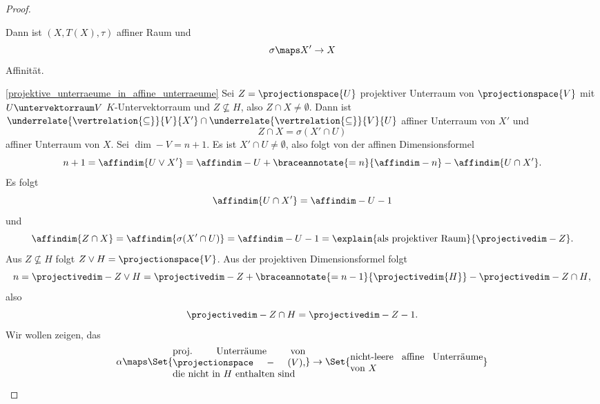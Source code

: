 \begin{proof}
\begin{proofdescription}
    Dann ist \( (X,T(X),\tau) \) affiner Raum und
    \begin{equation*}
      \sigma\maps X'\to X 
    \end{equation*}
    Affinität.
    \item[\ref{projektive_unterraeume_in_affine_unterraeume}] Sei \( Z=\projectionspace{U} \) projektiver Unterraum von \( \projectionspace{V} \) mit \( U\untervektorraum V \) \( K \)-Untervektorraum und \( Z\not\subseteq H \), also \( Z\cap X\neq \emptyset \). Dann ist \( \underrelate{\vertrelation{\subseteq}}{V}{X'}\cap  \underrelate{\vertrelation{\subseteq}}{V}{U} \) affiner Unterraum von \( X' \) und
    \begin{equation*}
      Z\cap X=\sigma(X'\cap U)
    \end{equation*}
    affiner Unterraum von \( X \).
     Sei \( \dim-{V}=n+1 \). Es ist \( X'\cap U\neq \emptyset \), also folgt von der affinen Dimensionsformel
    \begin{equation*}
      n+1=\affindim{U\vee X'}=\affindim-{U}+\braceannotate{=n}{\affindim-{n}}-\affindim{U\cap X'}.
    \end{equation*}
    Es folgt
    \begin{equation*}
      \affindim{U\cap X'}=\affindim-{U}-1
    \end{equation*}
    und
    \begin{equation*}
      \affindim{Z\cap X}=\affindim{\sigma(X'\cap U)}=\affindim-{U}-1=\explain{\text{als projektiver Raum}}{\projectivedim-{Z}}.
    \end{equation*}
    Aus  \( Z\not\subseteq H \) folgt \( Z\vee H=\projectionspace{V} \). Aus der projektiven Dimensionsformel folgt
    \begin{equation*}
      n=\projectivedim-{Z\vee H}=\projectivedim-{Z}+\braceannotate{=n-1}{\projectivedim{H}}-\projectivedim-{Z\cap H},
    \end{equation*}
    also
    \begin{equation*}
      \projectivedim-{Z\cap H}=\projectivedim-{Z}-1.
    \end{equation*}
    Wir wollen zeigen, das 
    \begin{equation*}
      \begin{split}
      \alpha\maps \Set{\parbox{0.4\textwidth}{proj.\ Unterräume von \( \projectionspace-{(V)} \), die nicht in \( H \) enthalten sind}}&\to \Set{\parbox{0.4\textwidth}{nicht-leere affine Unterräume von \( X \)}}\\

\end{split}
\end{equation*}
\end{proofdescription}
\end{proof}
